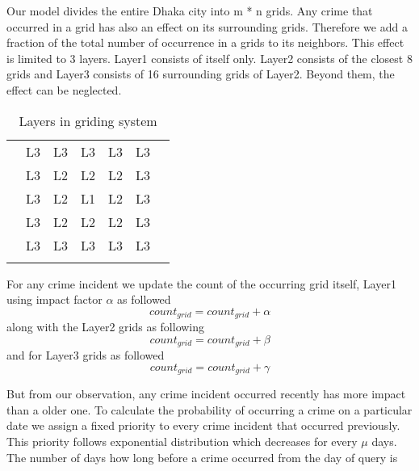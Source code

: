 \documentclass{sig-alternate}
\begin{document}
 Our model divides the entire Dhaka city into m * n grids. 
 Any crime that occurred in a grid has also an effect on its surrounding grids. Therefore we add a fraction of the total number of occurrence in a grids to its neighbors. This effect is limited to 3 layers. Layer1 consists of itself only. Layer2 consists of  the closest 8 grids and Layer3 consists of 16 surrounding grids of Layer2.  Beyond them, the effect can be neglected. 
 
 \begin{table}[h]
      \caption{ Layers in griding system}
      \label{results}
      \begin{center}
      \begin{tabular}{||c||c||c||c||c||c||c||}\hline
        &  &  &  &  &  &  \\ \hline\hline
        & L3 & L3 & L3 & L3 & L3 &  \\ \hline \hline
       	& L3 & L2 & L2  & L2 & L3 &  \\ \hline\hline
        & L3 & L2 & L1 & L2  & L3 & \\ \hline\hline
       	& L3 & L2  & L2  & L2  & L3 & \\\hline\hline
        & L3 & L3 & L3 & L3 & L3 & \\ \hline\hline
       &  &  &  &  &  &  \\ \hline
      \end{tabular}
      \end{center}
      \end{table}
 


  For any crime incident we update the count of the occurring grid itself, Layer1 using impact factor $\alpha$
  as followed
 \begin{equation}
     count_{grid} = count_{grid}+\alpha
     \label{layerone}
 \end{equation}
  along with the Layer2 grids as following
\begin{equation}
    count_{grid} = count_{grid}+\beta
    \label{layertwo}
\end{equation} 
and for Layer3 grids as followed 
\begin{equation}
    count_{grid} = count_{grid}+\gamma
    \label{layerthree}
\end{equation} 

But from our observation, any crime incident occurred recently has more impact than a older one. To calculate the probability of occurring a crime on a particular date we assign a fixed priority to every crime incident that occurred  previously. This priority follows exponential distribution which decreases for every $\mu$ days. The number of days how long before a crime occurred from the day of query is
\end{document}
